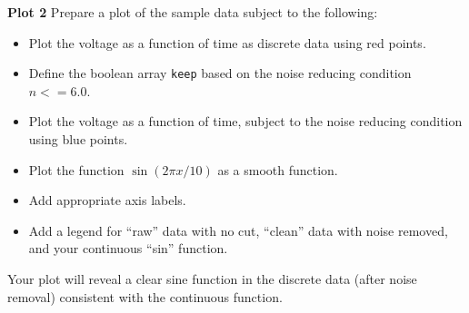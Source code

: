 \noindent
{\bf Plot 2} Prepare a plot of the sample data subject to the following:
\begin{itemize}
 \item Plot the voltage as a function of time as discrete data using red points.
 \item Define the boolean array {\tt keep} based on the noise reducing condition $n<=6.0$.
 \item Plot the voltage as a function of time, subject to the noise reducing condition using blue points.
 \item Plot the function $\sin(2 \pi x / 10)$ as a smooth function.
 \item Add appropriate axis labels.
 \item Add a legend for ``raw'' data with no cut, ``clean'' data with noise removed, and your continuous ``sin'' function.   
\end{itemize}
Your plot will reveal a clear sine function in the discrete data (after noise removal) consistent with the continuous function.  




